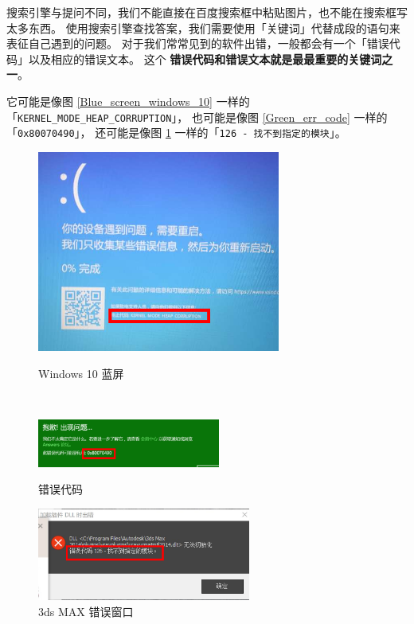 搜索引擎与提问不同，我们不能直接在百度搜索框中粘贴图片，也不能在搜索框写太多东西。
使用搜索引擎查找答案，我们需要使用「关键词」代替成段的语句来表征自己遇到的问题。
对于我们常常见到的软件出错，一般都会有一个「错误代码」以及相应的错误文本。
这个 \textbf{错误代码和错误文本就是最最重要的关键词之一}。

它可能是像图 \ref{Blue_screen_windows_10} 一样的「\verb|KERNEL_MODE_HEAP_CORRUPTION|」，
也可能是像图 \ref{Green_err_code} 一样的「\verb|0x80070490|」，
还可能是像图 \ref{3Ds_Max_err_code} 一样的「\verb|126 - 找不到指定的模块|」。

\begin{figure}[htb!]
  \centering
  \begin{minipage}{10cm}
    \centering
    \includegraphics[width=8cm]{assets/Blue_screen_windows_10.png}
    \caption{Windows 10 蓝屏}
    \label{Blue_screen_windows_10}
  \end{minipage}
  \\\vspace*{1ex}
  \begin{minipage}{6.2cm}
    \centering
    \includegraphics[width=6cm]{assets/Green_err_code.png}
    \caption{错误代码}
    \label{Green_err_code}
  \end{minipage}
  \quad
  \begin{minipage}{7.2cm}
    \centering
    \includegraphics[width=7cm]{assets/3Ds_Max_err_code.png}
    \caption{3ds MAX 错误窗口}
    \label{3Ds_Max_err_code}
  \end{minipage}
\end{figure}


